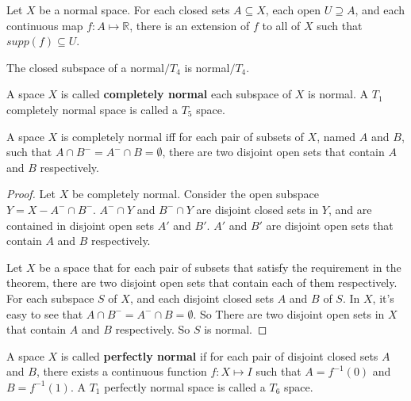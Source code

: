 \documentclass[12pt]{book}
\begin{document}
\begin{corollary}
	Let $X$ be a normal space. For each closed sets $A\subseteq X$, each open $U\supseteq A$, and each continuous map $f:A\mapsto \mathbb R$, there is an extension of $f$ to all of $X$ such that $supp(f)\subseteq U$.
\end{corollary}	
	
	
\begin{theorem}
	The closed subspace of a normal$/T_4$ is normal$/T_4$.
\end{theorem}
	
\begin{definition}
	A space $X$ is called {\bf completely normal} each subspace of $X$ is normal. A $T_1$ completely normal space is called a $T_5$ space.
\end{definition}

\begin{theorem}
	A space $X$ is completely normal iff for each pair of subsets of $X$, named $A$ and $B$, such that $A\cap B^-=A^-\cap B=\emptyset$, there are two disjoint open sets that contain $A$ and $B$ respectively.
\end{theorem}
\begin{proof}
	Let $X$ be completely normal. Consider the open subspace $Y=X-A^-\cap B^-$. $A^-\cap Y$ and $B^-\cap Y$ are disjoint closed sets in $Y$, and are contained in disjoint open sets $A'$ and $B'$. $A'$ and $B'$ are disjoint open sets that contain $A$ and $B$ respectively.
	
	Let $X$ be a space that for each pair of subsets that satisfy the requirement in the theorem, there are two disjoint open sets that contain each of them respectively. For each subspace $S$ of $X$, and each disjoint closed sets $A$ and $B$ of $S$. In $X$, it's easy to see that $A\cap B^-=A^-\cap B=\emptyset$. So There are two disjoint open sets in $X$ that contain $A$ and $B$ respectively. So $S$ is normal.
\end{proof}
	
\begin{definition}
	A space $X$ is called {\bf perfectly normal} if for each pair of disjoint closed sets $A$ and $B$, there exists a continuous function $f:X\mapsto I$ such that $A=f^{-1}(0)$ and $B=f^{-1}(1)$. A $T_1$ perfectly normal space is called a $T_6$ space.
\end{definition}
\end{document}
